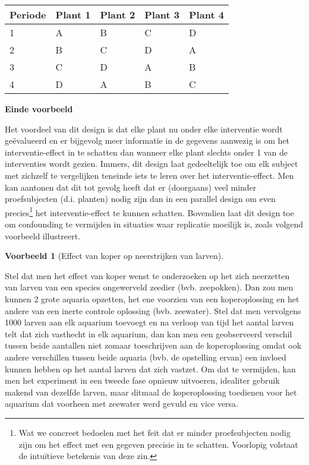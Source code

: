 \documentclass[
  12pt,dutch,coursenotes]{book}
\theoremstyle{definition}
\theoremstyle{definition}
\newtheorem{example}{Voorbeeld}[chapter]
\theoremstyle{definition}
\theoremstyle{remark}
\begin{document}
\begin{longtable}[]{@{}lllll@{}}
\toprule
Periode & Plant 1 & Plant 2 & Plant 3 & Plant 4\tabularnewline
\midrule
\endhead
1 & A & B & C & D\tabularnewline
2 & B & C & D & A\tabularnewline
3 & C & D & A & B\tabularnewline
4 & D & A & B & C\tabularnewline
\bottomrule
\end{longtable}

\textbf{Einde voorbeeld}

Het voordeel van dit design is dat elke plant nu onder elke
interventie wordt geëvalueerd en er bijgevolg meer informatie in de
gegevens aanwezig is om het interventie-effect in te schatten dan wanneer
elke plant slechts onder 1 van de interventies wordt gezien. Immers, dit design laat gedeeltelijk toe om elk subject met zichzelf te vergelijken teneinde iets te leren over het interventie-effect. Men kan
aantonen dat dit tot gevolg heeft dat er (doorgaans) veel minder
proefsubjecten (d.i. planten) nodig zijn dan in een parallel design om even precies\footnote{Wat we concreet bedoelen met het feit dat er minder proefsubjecten nodig zijn
  om het effect met een gegeven precisie in te schatten. Voorlopig volstaat de intuïtieve betekenis van deze zin.} het interventie-effect te kunnen
schatten. Bovendien laat dit design toe om confounding te vermijden in situaties waar replicatie moeilijk is, zoals volgend voorbeeld illustreert.

\begin{example}[Effect van koper op neerstrijken van larven]
\protect\hypertarget{exm:unnamed-chunk-77}{}{\label{exm:unnamed-chunk-77} \iffalse (Effect van koper op neerstrijken van larven) \fi{} }
\end{example}

Stel dat men het effect van koper wenst te onderzoeken op het zich neerzetten van larven van een species ongewerveld zeedier (bvb. zeepokken). Dan zou men kunnen 2 grote aquaria opzetten, het ene voorzien van een koperoplossing en het andere van een inerte controle oplossing (bvb. zeewater). Stel dat men vervolgens 1000 larven aan elk aquarium toevoegt en na verloop van tijd het aantal larven telt dat zich vasthecht in elk aquarium, dan kan men een geobserveerd verschil tussen beide aantallen niet zomaar toeschrijven aan de koperoplossing omdat ook andere verschillen tussen beide aquaria (bvb. de opstelling ervan) een invloed kunnen hebben op het aantal larven dat zich vastzet. Om dat te vermijden, kan men het experiment in een tweede fase opnieuw uitvoeren, idealiter gebruik makend van dezelfde larven, maar ditmaal de koperoplossing toedienen voor het aquarium dat voorheen met zeewater werd gevuld en vice versa.
\end{document}
